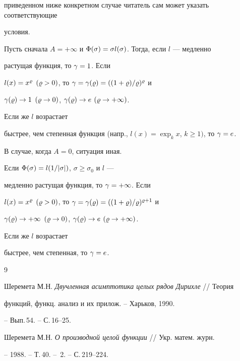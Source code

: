 приведенном ниже конкретном случае читатель сам может указать соответствующие


условия. 





Пусть сначала $A=+\infty$ и $\Phi(\sigma)=\sigma l(\sigma)$. Тогда, если $l$ --- медленно


растущая функция, то $\gamma=1$. Если 


$l(x)=x^{\varrho}$ $(\varrho>0)$, то $\gamma=\gamma(\varrho)=((1+\varrho)/\varrho)^{\varrho}$ и


$\gamma(\varrho)\to1$ $(\varrho\to 0)$, $\gamma(\varrho)\to e$ $(\varrho\to+\infty)$.


Если же $l$ возрастает


быстрее, чем степенная функция (напр., $l(x)=\exp_k x$, $k\ge1)$, то $\gamma=e$.





В случае, когда $A=0$, ситуация иная.


Если $\Phi(\sigma)=l(1/|\sigma|)$, $\sigma\ge\sigma_0$ и $l$ ---


медленно растущая функция, то $\gamma=+\infty$. Если


$l(x)=x^{\varrho}$ $(\varrho>0)$, то $\gamma=\gamma(\varrho)=((1+\varrho)/\varrho)^{\varrho+1}$ и


$\gamma(\varrho)\to+\infty$ $(\varrho\to0)$, $\gamma(\varrho)\to e$ $(\varrho\to+\infty)$. 


Если же $l$ возрастает


быстрее, чем степенная, то $\gamma=e$.








\begin{thebibliography}{9}







Шеремета М.Н. {\em Двучленная асимптотика целых рядов Дирихле} // Теория


функций, функц. анализ и их прилож. -- Харьков, 1990.


-- Вып.\,54. -- С.\,16--25.




Шеремета М.Н. {\em О производной целой функции} // Укр. матем. журн.


-- 1988. -- Т.\,40. -- \No\,2. -- С.\,219--224.





\end{thebibliography}





\vskip 2cm












\label{end}





